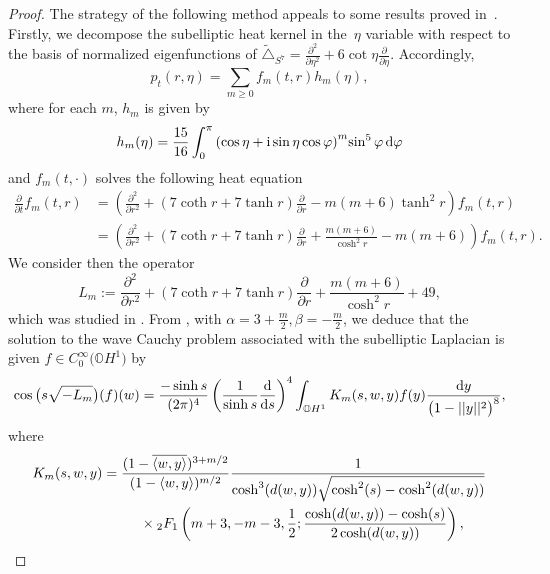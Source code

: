 \documentclass[10pt,a4paper]{amsart}
\numberwithin{equation}{section}
\begin{document}
\begin{proof}
The strategy of the following method appeals to some results proved in~\cite{AIMVOM97}. Firstly, we decompose the subelliptic heat kernel in the~$\eta$ variable with respect to the basis of normalized eigenfunctions of $\tilde{\triangle}_{S^7}=\frac{{\partial}^2}{\partial {\eta}^2}+6\cot \eta\frac{{\partial}}{\partial {\eta}}$.
Accordingly,
\begin{equation*}
p_t(r,\eta)=\sum_{m\geq 0} f_m(t,r)h_m(\eta),
\end{equation*}
where for each $m$, $h_m$ is given by
\begin{equation*}%
h_m(\eta)=\frac{15}{16}\int_{0}^{\pi}{(\cos \eta + {\rm i}\sin \eta \cos \varphi)}^m{\sin^5 \varphi}\, {\rm d} \varphi
\end{equation*}
and $f_m(t,\cdot)$ solves the following heat equation
\begin{align*}
\frac{\partial}{\partial t}f_m(t,r)& =\left( \frac{{\partial}^2}{\partial {r}^2}+(7\coth r+7\tanh r)\frac{{\partial}}{\partial {r}}-m(m+6){\tanh^2 r} \right) f_m(t,r) \\
&=\left( \frac{{\partial}^2}{\partial {r}^2}+(7\coth r+7\tanh r)\frac{{\partial}}{\partial {r}}+\frac{m(m+6)}{\cosh^2 r}-m(m+6) \right) f_m(t,r).
\end{align*}
We consider then the operator
\begin{equation*}
L_m:=\frac{{\partial}^2}{\partial {r}^2}+(7\coth r+7\tanh r)\frac{{\partial}}{\partial {r}}+\frac{m(m+6)}{\cosh^2 r}+49,
\end{equation*}
which was studied in \cite[p.~229]{AIMVOM97}.
From \cite[Theorem~2]{AIMVOM97}, with $\alpha=3+\frac{m}{2}, \beta=-\frac{m}{2}$, we deduce that the solution to the wave Cauchy problem associated with the subelliptic Laplacian is given $f\in C^{\infty}_{0}\big(\mathbb{O}H^1\big)$ by
\begin{equation*}
\cos \big(s\sqrt{-L_{m}}\big)(f)(w)=\frac{-\sinh s}{(2\pi)^{4}}\left(\frac{1}{\sinh s }\frac{{\rm d}}{{\rm d}s}\right)^{4}\int_{\mathbb{O}H^1}K_m(s,w,y)f(y)\frac{{\rm d}y}{\big(1-||y||^2\big)^{8}},
\end{equation*}
where
\begin{gather*}
K_m(s,w,y) =\frac{(1-\overline{\langle w,y\rangle})^{3+m/2}}{(1-\langle w,y\rangle)^{m/2}}\frac{1}{\cosh^3(d(w,y))\sqrt{\cosh^2(s)-\cosh^2(d(w,y))}} \\
\hphantom{K_m(s,w,y) =}{} \times {_2}F_{1}\left(m+3,-m-3,\frac{1}{2};\frac{\cosh(d(w,y))-\cosh(s)}{2\cosh(d(w,y)) }\right),
\end{gather*}

\end{proof}
\end{document}

